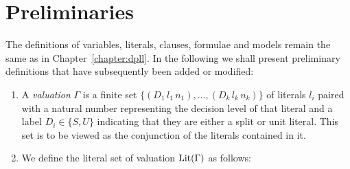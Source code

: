 \section{Preliminaries}
The definitions of variables, literals, clauses, formulae and models remain the same as in Chapter~\ref{chapter:dpll}. In the following we shall present preliminary definitions that have subsequently been added or modified: \\
%
%
\begin{mydef}
\hspace{3mm}
\begin{enumerate}

%
%
%
%
%
%
%
\item A \emph{valuation} $\Gamma$ is a finite set $\{ (D_1 \, l_1 \, n_1), \ldots , ( D_k \, l_k \, n_k) \}$ of literals $l_i$ paired with a natural number representing the decision level of that literal and a label $D_i \in \{S, U\}$ indicating that they are either a split or unit literal. This set is to be viewed as the conjunction of the literals contained in it.
%
\item We define the literal set of valuation $\mathrm{Lit}(\Gamma)$ as follows:

\end{enumerate}
\end{mydef}
